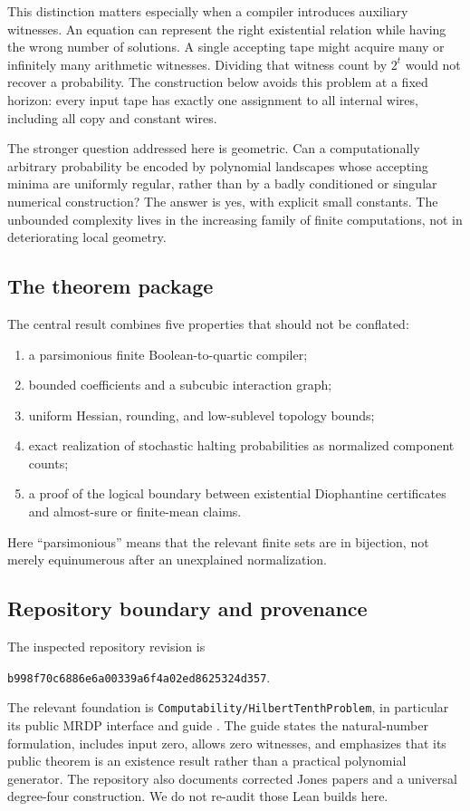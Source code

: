 \documentclass[11pt,letterpaper]{article}
\numberwithin{equation}{section}
\theoremstyle{definition}
\theoremstyle{remark}
\begin{document}
This distinction matters especially when a compiler introduces auxiliary
witnesses. An equation can represent the right existential relation while
having the wrong number of solutions. A single accepting tape might acquire
many or infinitely many arithmetic witnesses. Dividing that witness count by
$2^t$ would not recover a probability. The construction below avoids this
problem at a fixed horizon: every input tape has exactly one assignment to
all internal wires, including all copy and constant wires.

The stronger question addressed here is geometric. Can a computationally
arbitrary probability be encoded by polynomial landscapes whose accepting
minima are uniformly regular, rather than by a badly conditioned or singular
numerical construction? The answer is yes, with explicit small constants.
The unbounded complexity lives in the increasing family of finite
computations, not in deteriorating local geometry.

\subsection{The theorem package}
The central result combines five properties that should not be conflated:
\begin{enumerate}[label=(\roman*)]
\item a parsimonious finite Boolean-to-quartic compiler;
\item bounded coefficients and a subcubic interaction graph;
\item uniform Hessian, rounding, and low-sublevel topology bounds;
\item exact realization of stochastic halting probabilities as normalized
component counts;
\item a proof of the logical boundary between existential Diophantine
certificates and almost-sure or finite-mean claims.
\end{enumerate}
Here ``parsimonious'' means that the relevant finite sets are in bijection,
not merely equinumerous after an unexplained normalization.

\subsection{Repository boundary and provenance}
The inspected repository revision is
\begin{center}
\texttt{b998f70c6886e6a00339a6f4a02ed8625324d357}.
\end{center}
The relevant foundation is
\texttt{Computability/HilbertTenthProblem}, in particular its public MRDP
interface and guide \cite{b62s13-repoHTP,b62s13-repoMRDP}. The guide states the natural-number
formulation, includes input zero, allows zero witnesses, and emphasizes that
its public theorem is an existence result rather than a practical
polynomial generator. The repository also documents corrected Jones papers
and a universal degree-four construction. We do not re-audit those Lean
builds here.
\end{document}
